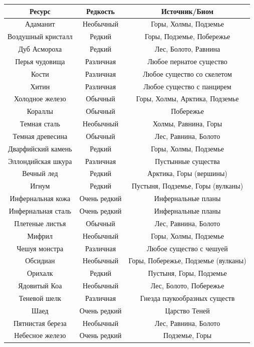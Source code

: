 \documentclass[a4paper, 9pt, twocolumn]{book}
\begin{document}
	\begin{center}
		
		\begin{tabular}{|c|c|c|}
			\hline
			\textbf{Ресурс} & \textbf{Редкость} & \textbf{Источник/Биом} \\
			\hline
			Адаманит & Необычный & Горы, Холмы, Подземье \\
			\hline
			Воздушный кристалл & Редкий & Горы, Подземье, Побережье \\
			\hline
			Дуб Асмороха & Редкий & Лес, Болото, Равнина \\
			\hline
			Перья чудовища & Различная & Любое пернатое существо \\
			\hline
			Кости & Различная & Любое существо со скелетом \\
			\hline
			Хитин & Различная & Любое существо с панцирем \\
			\hline
			Холодное железо & Обычный & Горы, Холмы, Арктика, Подземье \\
			\hline
			Кораллы & Обычный & Побережье \\
			\hline
			Темная сталь & Необычный & Холмы, Равнина, Горы \\
			\hline
			Темная древесина & Обычный & Лес, Равнина, Болото \\
			\hline
			Дварфийский камень & Редкий & Горы, Холмы, Подземье \\
			\hline
			Эллондийская шкура & Различная & Пустынные существа  \\
			\hline
			Вечный лед & Редкий & Арктика, Горы (вершины) \\
			\hline
			Игнум & Редкий & Пустыня, Подземье, Горы (вулканы) \\
			\hline
			Инфернальная кожа & Очень редкий & Инфернальные планы \\
			\hline
			Инфернальная сталь & Очень редкий & Инфернальные планы \\
			\hline
			Плетеные листья & Обычный & Лес, Равнина, Болото \\
			\hline
			Мифрил & Необычный & Горы, Холмы, Подземье \\
			\hline
			Чешуя монстра & Различная & Любое существо с чешуей \\
			\hline
			Обсидиан & Необычный & Горы, Побережье, Подземье (вулканы) \\
			\hline
			Орихалк & Редкий & Пустыня, Горы, Подземье \\
			\hline
			Ядовитый Коа & Необычный & Лес, Болото, Побережье \\
			\hline
			Теневой шелк & Различная & Гнезда паукообразных существ \\
			\hline
			Шаед & Очень редкий & Царство Теней \\
			\hline
			Пятнистая береза & Необычный & Лес, Равнина, Болото \\
			\hline
			Небесное железо & Очень редкий & Подземье, Горы \\
			\hline
		\end{tabular}
	\end{center}
	
\end{document}
